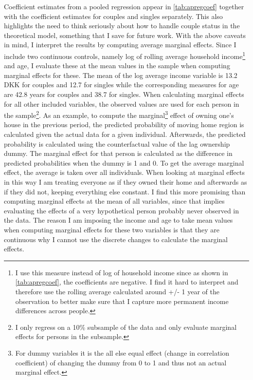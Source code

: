 Coefficient estimates from a pooled regression appear in \autoref{tab:apregcoef} together with the coefficient estimates for couples and singles separately. This also highlights the need to think seriously about how to handle couple status in the theoretical model, something that I save for future work. With the above caveats in mind, I interpret the results by computing average marginal effects. Since I include two continuous controls, namely log of rolling average household income\footnote{I use this measure instead of log of household income since as shown in \autoref{tab:apregcoef}, the coefficients are negative. I find it hard to interpret and therefore use the rolling average calculated around +/- 1 year of the observation to better make sure that I capture more permanent income differences across people.} and age, I evaluate these at the mean values in the sample when computing marginal effects for these. The mean of the log average income variable is 13.2 DKK for couples and 12.7 for singles while the corresponding measures for age are 42.8 years for couples and 38.7 for singles. When calculating marginal effects for all other included variables, the observed values are used for each person in the sample\footnote{I only regress on a 10\% subsample of the data and only evaluate marginal effects for persons in the subsample.}. As an example, to compute the marginal\footnote{For dummy variables it is the all else equal effect (change in correlation coefficient) of changing the dummy from 0 to 1 and thus not an actual marginal effect.} effect of owning one's house in the previous period, the predicted probability of moving home region is calculated given the actual data for a given individual. Afterwards, the predicted probability is calculated using the counterfactual value of the lag ownership dummy. The marginal effect for that person is calculated as the difference in predicted probabilities when the dummy is 1 and 0. To get the average marginal effect, the average is taken over all individuals. When looking at marginal effects in this way I am treating everyone as if they owned their home and afterwards as if they did not, keeping everything else constant. I find this more promising than computing marginal effects at the mean of all variables, since that implies evaluating the effects of a very hypothetical person probably never observed in the data. The reason I am imposing the income and age to take mean values when computing marginal effects for these two variables is that they are continuous why I cannot use the discrete changes to calculate the marginal effects. 

